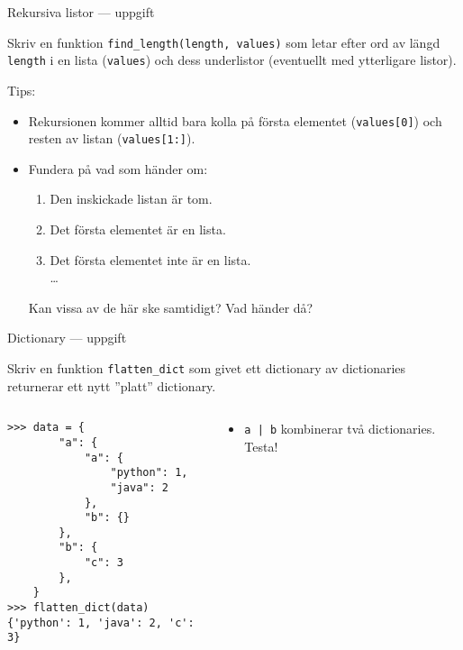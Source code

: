 \documentclass{beamer}
\begin{document}

  \begin{frame}[fragile]{Rekursiva listor --- uppgift}

    Skriv en funktion \texttt{find\_length(length, values)} som letar efter ord
      av längd \texttt{length} i en lista (\texttt{values}) och dess underlistor
      (eventuellt med ytterligare listor).

    Tips:

    \vspace{-1em}

    \begin{itemize}

      \item Rekursionen kommer alltid bara kolla på första elementet
      (\texttt{values[0]}) och resten av listan (\texttt{values[1:]}).

      \item Fundera på vad som händer om:

      \begin{enumerate}
        \item Den inskickade listan är tom.
        \item Det första elementet är en lista.
        \item Det första elementet inte är en lista. \\
        \dots{}
      \end{enumerate}

      Kan vissa av de här ske samtidigt? Vad händer då?

    \end{itemize}

  \end{frame}

  \begin{frame}[fragile]{Dictionary --- uppgift}

    Skriv en funktion \texttt{flatten\_dict} som givet ett dictionary av
    dictionaries returnerar ett nytt ''platt'' dictionary.

    \begin{columns}
      \begin{column}{0.48\textwidth}
        \begin{verbatim}
>>> data = {
        "a": {
            "a": {
                "python": 1,
                "java": 2
            },
            "b": {}
        },
        "b": {
            "c": 3
        },
    }
>>> flatten_dict(data)
{'python': 1, 'java': 2, 'c': 3}
        \end{verbatim}
      \end{column}
      \begin{column}{0.48\textwidth}

        \begin{itemize}
          \item \texttt{a | b} kombinerar två dictionaries. Testa!
        \end{itemize}

      \end{column}
    \end{columns}

  \end{frame}
\end{document}
